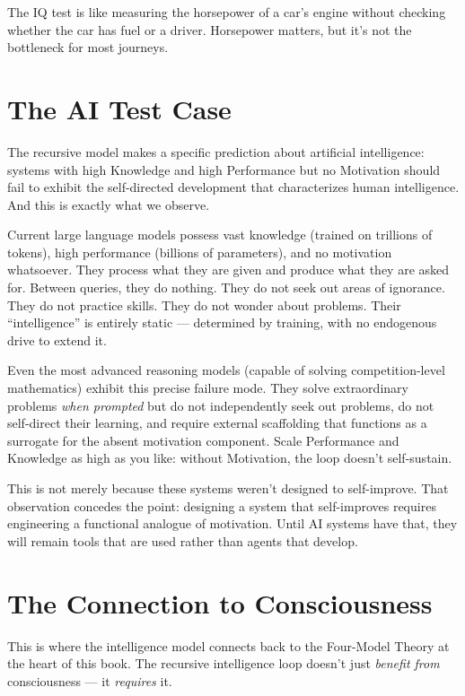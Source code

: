 \documentclass[11pt, twoside, openright]{book}
\begin{document}
The IQ test is like measuring the horsepower of a car's engine without checking whether the car has fuel or a driver. Horsepower matters, but it's not the bottleneck for most journeys.

\section*{The AI Test Case}

The recursive model makes a specific prediction about artificial intelligence: systems with high Knowledge and high Performance but no Motivation should fail to exhibit the self-directed development that characterizes human intelligence. And this is exactly what we observe.

Current large language models possess vast knowledge (trained on trillions of tokens), high performance (billions of parameters), and no motivation whatsoever. They process what they are given and produce what they are asked for. Between queries, they do nothing. They do not seek out areas of ignorance. They do not practice skills. They do not wonder about problems. Their ``intelligence'' is entirely static --- determined by training, with no endogenous drive to extend it.

Even the most advanced reasoning models (capable of solving competition-level mathematics) exhibit this precise failure mode. They solve extraordinary problems \textit{when prompted} but do not independently seek out problems, do not self-direct their learning, and require external scaffolding that functions as a surrogate for the absent motivation component. Scale Performance and Knowledge as high as you like: without Motivation, the loop doesn't self-sustain.

This is not merely because these systems weren't designed to self-improve. That observation concedes the point: designing a system that self-improves requires engineering a functional analogue of motivation. Until AI systems have that, they will remain tools that are used rather than agents that develop.

\section*{The Connection to Consciousness}

This is where the intelligence model connects back to the Four-Model Theory at the heart of this book. The recursive intelligence loop doesn't just \textit{benefit from} consciousness --- it \textit{requires} it.
\end{document}
